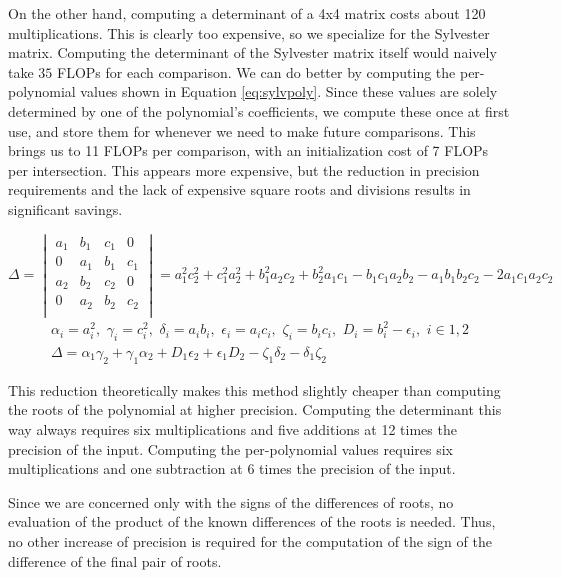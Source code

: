 \documentclass{cccg16}
\begin{document}
On the other hand, computing a determinant of a 4x4 matrix costs about
120 multiplications.  This is clearly too expensive, so we specialize
for the Sylvester matrix.  Computing the determinant of the Sylvester
matrix itself would naively take $35$ FLOPs for each comparison.  We
can do better by computing the per-polynomial values shown in Equation
\ref{eq:sylvpoly}.  Since these values are solely determined by one of
the polynomial's coefficients, we compute these once at first use, and
store them for whenever we need to make future comparisons.  This
brings us to 11 FLOPs per comparison, with an initialization cost of 7
FLOPs per intersection.  This appears more expensive, but the
reduction in precision requirements and the lack of expensive square
roots and divisions results in significant savings.
\begin{figure*}
  \begin{equation*}
    \Delta=\begin{vmatrix}
    a_1 & b_1 & c_1 & 0\\
    0 & a_1 & b_1 & c_1\\
    a_2 & b_2 & c_2 & 0\\
    0 & a_2 & b_2 & c_2\\
    \end{vmatrix}=
    a_1^2 c_2^2 + c_1^2 a_2^2 + b_1^2 a_2 c_2 + b_2^2 a_1 c_1 -
    b_1 c_1 a_2 b_2 - a_1 b_1 b_2 c_2 - 2 a_1 c_1 a_2 c_2
  \end{equation*}
  \begin{align}
    \alpha_i=a_i^2,\,\, \gamma_i=c_i^2,\,\,
    \delta_i=a_i b_i,\,\, \epsilon_i=a_i c_i,\,\, \zeta_i=b_i c_i,\,\,
    D_i=b_i^2-\epsilon_i,\,\,
    i\in {1, 2}\\
    \Delta = \alpha_1 \gamma_2 + \gamma_1 \alpha_2 +
    D_1 \epsilon_2 + \epsilon_1 D_2 - \zeta_1 \delta_2 -
    \delta_1 \zeta_2
  \label{eq:sylvpoly}
  \end{align}
\end{figure*}
This reduction theoretically makes this method slightly cheaper than
computing the roots of the polynomial at higher precision.  Computing
the determinant this way always requires six multiplications and five
additions at 12 times the precision of the input.  Computing the
per-polynomial values requires six multiplications and one subtraction
at 6 times the precision of the input.

Since we are concerned only with the signs of the differences of
roots, no evaluation of the product of the known differences of the
roots is needed.  Thus, no other increase of precision is required for
the computation of the sign of the difference of the final pair of
roots.
\end{document}
